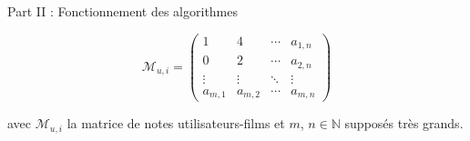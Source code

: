 \begin{frame}{Part II : Fonctionnement des algorithmes}

    $$\mathcal{M}_{u, i} =
        \begin{pmatrix}
            1        & 4        & \cdots{} & a_{1, n} \\
            0        & 2        & \cdots{} & a_{2, n} \\
            \vdots{} & \vdots{} & \ddots{} & \vdots{} \\
            a_{m, 1} & a_{m, 2} & \cdots{} & a_{m, n}
        \end{pmatrix}
    $$

    avec $\mathcal{M}_{u, i}$ la matrice de notes utilisateurs-films et $m$, $n \in \mathbb{N}$ supposés très grands.

\end{frame}

